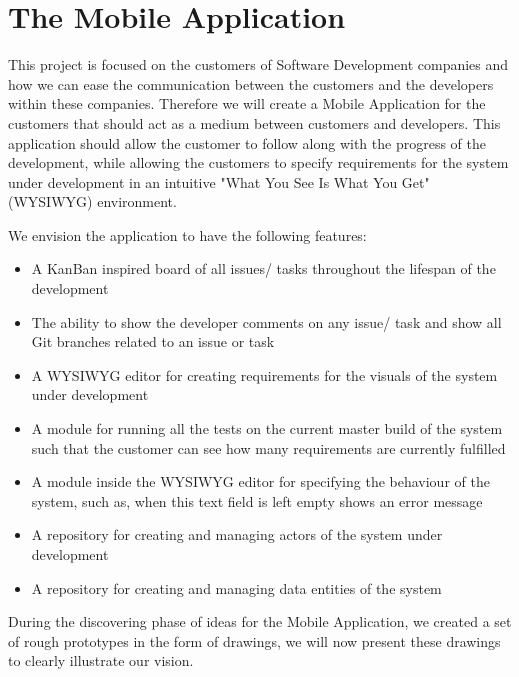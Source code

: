 \section{The Mobile Application}
This project is focused on the customers of Software Development companies and how we can ease the communication between the customers and the developers within these companies.
Therefore we will create a Mobile Application for the customers that should act as a medium between customers and developers. 
This application should allow the customer to follow along with the progress of the development, while allowing the customers to specify requirements for the system under development in an intuitive "What You See Is What You Get" (WYSIWYG) environment.

We envision the application to have the following features:

\begin{itemize}
    \item A KanBan inspired board of all issues/ tasks throughout the lifespan of the development
    \item The ability to show the developer comments on any issue/ task and show all Git branches related to an issue or task
    \item A WYSIWYG editor for creating requirements for the visuals of the system under development
    \item A module for running all the tests on the current master build of the system such that the customer can see how many requirements are currently fulfilled
    \item A module inside the WYSIWYG editor for specifying the behaviour of the system, such as, when this text field is left empty shows an error message
    \item A repository for creating and managing actors of the system under development
    \item A repository for creating and managing data entities of the system
\end{itemize}

During the discovering phase of ideas for the Mobile Application, we created a set of rough prototypes in the form of drawings, we will now present these drawings to clearly illustrate our vision.

